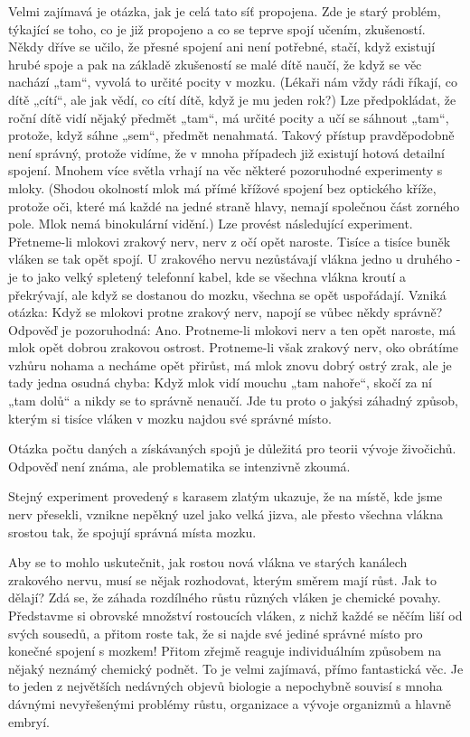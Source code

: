     Velmi zajímavá je otázka, jak je celá tato síť propojena. Zde je starý problém, týkající se
    toho, co je již propojeno a co se teprve spojí učením, zkušeností. Někdy dříve se učilo, že
    přesné spojení ani není potřebné, stačí, když existují hrubé spoje a pak na základě zkušeností
    se malé dítě naučí, že když se věc nachází „tam“, vyvolá to určité pocity v mozku. (Lékaři nám
    vždy rádi říkají, co dítě „cítí“, ale jak vědí, co cítí dítě, když je mu jeden rok?) Lze
    předpokládat, že roční dítě vidí nějaký předmět „tam“, má určité pocity a učí se sáhnout „tam“,
    protože, když sáhne „sem“, předmět nenahmatá. Takový přístup pravděpodobně není správný, protože
    vidíme, že v mnoha případech již existují hotová detailní spojení. Mnohem více světla vrhají na
    věc některé pozoruhodné experimenty s mloky. (Shodou okolností mlok má přímé křížové spojení bez
    optického kříže, protože oči, které má každé na jedné straně hlavy, nemají společnou část
    zorného pole. Mlok nemá binokulární vidění.) Lze provést následující experiment. Přetneme-li
    mlokovi zrakový nerv, nerv z očí opět naroste. Tisíce a tisíce buněk vláken se tak opět spojí. U
    zrakového nervu nezůstávají vlákna jedno u druhého - je to jako velký spletený telefonní kabel,
    kde se všechna vlákna kroutí a překrývají, ale když se dostanou do mozku, všechna se opět
    uspořádají. Vzniká otázka: Když se mlokovi protne zrakový nerv, napojí se vůbec někdy správně?
    Odpověď je pozoruhodná: Ano. Protneme-li mlokovi nerv a ten opět naroste, má mlok opět dobrou
    zrakovou ostrost. Protneme-li však zrakový nerv, oko obrátíme vzhůru nohama a necháme opět
    přirůst, má mlok znovu dobrý ostrý zrak, ale je tady jedna osudná chyba: Když mlok vidí mouchu
    „tam nahoře“, skočí za ní „tam dolů“ a nikdy se to správně nenaučí. Jde tu proto o jakýsi
    záhadný způsob, kterým si tisíce vláken v mozku najdou své správné místo.

    Otázka počtu daných a získávaných spojů je důležitá pro teorii vývoje živočichů. Odpověď není
    známa, ale problematika se intenzivně zkoumá.
    
    Stejný experiment provedený s karasem zlatým ukazuje, že na místě, kde jsme nerv přesekli,
    vznikne nepěkný uzel jako velká jizva, ale přesto všechna vlákna srostou tak, že spojují správná
    místa mozku.
    
    Aby se to mohlo uskutečnit, jak rostou nová vlákna ve starých kanálech zrakového nervu, musí se
    nějak rozhodovat, kterým směrem mají růst. Jak to dělají? Zdá se, že záhada rozdílného růstu
    různých vláken je chemické povahy. Představme si obrovské množství rostoucích vláken, z nichž
    každé se něčím liší od svých sousedů, a přitom roste tak, že si najde své jediné správné místo
    pro konečné spojení s mozkem! Přitom zřejmě reaguje individuálním způsobem na nějaký neznámý
    chemický podnět. To je velmi zajímavá, přímo fantastická věc. Je to jeden z největších nedávných
    objevů biologie a nepochybně souvisí s mnoha dávnými nevyřešenými problémy růstu, organizace a
    vývoje organizmů a hlavně embryí.

